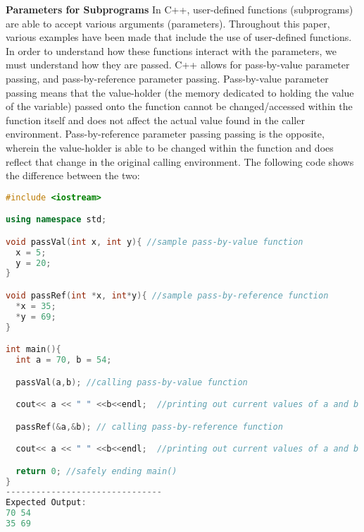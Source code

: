 \documentclass[12pt]{article}
\begin{document}
\textbf{Parameters for Subprograms} In C++, user-defined functions (subprograms) are able to accept various arguments (parameters). Throughout this paper, various examples have been made that include the use of user-defined functions. In order to understand how these functions interact with the parameters, we must understand how they are passed. C++ allows for pass-by-value parameter passing, and pass-by-reference parameter passing. Pass-by-value parameter passing means that the value-holder (the memory dedicated to holding the value of the variable) passed onto the function cannot be changed/accessed within the function itself and does not affect the actual value found in the caller environment. Pass-by-reference parameter passing passing is the opposite, wherein the value-holder is able to be changed within the function and does reflect that change in the original calling environment. The following code shows the difference between the two:
\begin{lstlisting}[language=C++]
#include <iostream>

using namespace std;

void passVal(int x, int y){ //sample pass-by-value function
  x = 5;
  y = 20;
}

void passRef(int *x, int*y){ //sample pass-by-reference function
  *x = 35;
  *y = 69;
}

int main(){
  int a = 70, b = 54;

  passVal(a,b); //calling pass-by-value function

  cout<< a << " " <<b<<endl;  //printing out current values of a and b

  passRef(&a,&b); // calling pass-by-reference function

  cout<< a << " " <<b<<endl;  //printing out current values of a and b

  return 0; //safely ending main()
}
-------------------------------
Expected Output:
70 54
35 69
\end{lstlisting}
\end{document}
